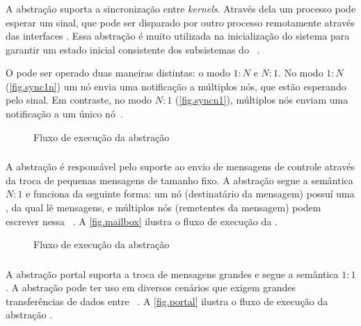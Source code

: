 \subsubsection{\sync}

A abstração \sync suporta a sincronização entre \textit{kernels}. Através dela um processo pode esperar um sinal, que pode ser disparado por outro processo remotamente através das interfaces \noc. Essa abstração é muito utilizada na inicialização do sistema para garantir um estado inicial consistente dos subsistemas do \os~\cite{penna:thesis}.

O \sync pode ser operado duas maneiras distintas: o modo $1:N$ e $N:1$. No modo $1:N$ (\autoref{fig.sync1n}) um nó envia uma notificação a múltiplos nós, que estão esperando pelo sinal. Em contraste, no modo $N:1$ (\autoref{fig.syncn1}), múltiplos nós enviam uma notificação a um único nó~\cite{penna:thesis}.

\begin{figure}[t]
    \centering
    
    \caption{Fluxo de execução da abstração \mailbox~\cite{penna:thesis}}
    \label{fig.mailbox}
\end{figure}

\subsubsection{\mailbox}

A abstração \mailbox é responsável pelo suporte ao envio de mensagens de controle através da troca de pequenas mensagens de tamanho fixo. A abstração segue a semântica $N:1$ e funciona da seguinte forma: um nó (destinatário da mensagem) possuí uma \mailbox, da qual lê mensagens, e múltiplos nós (remetentes da mensagem) podem escrever nessa \mailbox~\cite{penna:thesis}. A \autoref{fig.mailbox} ilustra o fluxo de execução da \mailbox.

\begin{figure}[t]
    \centering
    
    \caption{Fluxo de execução da abstração \portal \cite{penna:thesis}}\label{fig.portal}
\end{figure}

\subsubsection{\portal}

A abstração portal suporta a troca de mensagens grandes e segue a semântica $1:1$. A abstração pode ter uso em diversos cenários que exigem grandes transferências de dados entre \clusters~\cite{penna:thesis}. A \autoref{fig.portal} ilustra o fluxo de execução da abstração \portal.

